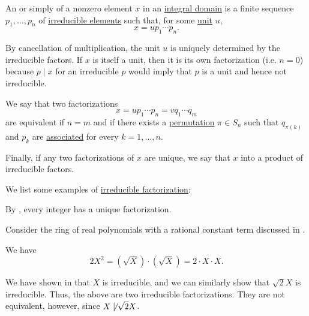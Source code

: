 \begin{definition}\label{def:irreducible_factorization}\mimprovised
  An  or simply  of a nonzero element \( x \) in an \hyperref[def:integral_domain]{integral domain} is a finite sequence \( p_1, \ldots, p_n \) of \hyperref[def:domain_divisibility/irreducible]{irreducible elements} such that, for some \hyperref[def:divisibility/unit]{unit} \( u \),
  \begin{equation*}
    x = u p_1 \cdots p_n.
  \end{equation*}

  By cancellation of multiplication, the unit \( u \) is uniquely determined by the irreducible factors. If \( x \) is itself a unit, then it is its own factorization (i.e. \( n = 0 \)) because \( p \mid x \) for an irreducible \( p \) would imply that \( p \) is a unit and hence not irreducible.

  We say that two factorizations
  \begin{equation*}
    x = u p_1 \cdots p_n = v q_1 \cdots q_m
  \end{equation*}
  are equivalent if \( n = m \) and if there exists a \hyperref[def:symmetric_group/permutation]{permutation} \( \pi \in S_n \) such that \( q_{\pi(k)} \) and \( p_k \) are \hyperref[def:domain_divisibility/associates]{associated} for every \( k = 1, \ldots, n \).

  Finally, if any two factorizations of \( x \) are unique, we say that \( x \)  into a product of irreducible factors.
\end{definition}

\begin{example}\label{ex:def:irreducible_factorization}
  We list some examples of \hyperref[def:irreducible_factorization]{irreducible factorization}:
  \begin{thmenum}
     By , every integer has a unique factorization.

     Consider the ring of real polynomials with a rational constant term discussed in .

    We have
    \begin{equation*}
      2X^2 = (\sqrt X) \cdot (\sqrt X) = 2 \cdot X \cdot X.
    \end{equation*}

    We have shown in  that \( X \) is irreducible, and we can similarly show that \( \sqrt 2 X \) is irreducible. Thus, the above are two irreducible factorizations. They are not equivalent, however, since \( X \not\mid \sqrt 2 X \).
  \end{thmenum}
\end{example}

